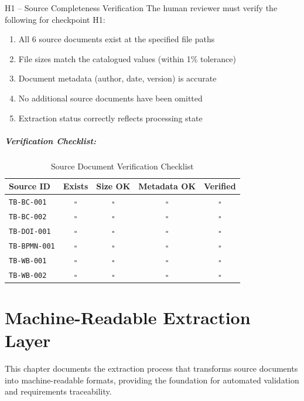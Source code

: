\documentclass[11pt,a4paper,twoside]{report}
\newcommand{\srcref}[1]{\texttt{#1}}
\begin{document}
\begin{hitlbox}{H1 -- Source Completeness Verification}
The human reviewer must verify the following for checkpoint H1:
\begin{enumerate}[noitemsep]
\item All 6 source documents exist at the specified file paths
\item File sizes match the catalogued values (within 1\% tolerance)
\item Document metadata (author, date, version) is accurate
\item No additional source documents have been omitted
\item Extraction status correctly reflects processing state
\end{enumerate}
\end{hitlbox}

\paragraph{Verification Checklist:}

\begin{table}[h]
\centering
\caption{Source Document Verification Checklist}
\begin{tabular}{@{}lcccc@{}}
\toprule
\textbf{Source ID} & \textbf{Exists} & \textbf{Size OK} & \textbf{Metadata OK} & \textbf{Verified} \\
\midrule
\srcref{TB-BC-001} & $\square$ & $\square$ & $\square$ & $\square$ \\
\srcref{TB-BC-002} & $\square$ & $\square$ & $\square$ & $\square$ \\
\srcref{TB-DOI-001} & $\square$ & $\square$ & $\square$ & $\square$ \\
\srcref{TB-BPMN-001} & $\square$ & $\square$ & $\square$ & $\square$ \\
\srcref{TB-WB-001} & $\square$ & $\square$ & $\square$ & $\square$ \\
\srcref{TB-WB-002} & $\square$ & $\square$ & $\square$ & $\square$ \\
\bottomrule
\end{tabular}
\end{table}
\chapter{Machine-Readable Extraction Layer}
\label{ch:extraction-layer}

This chapter documents the extraction process that transforms source
documents into machine-readable formats, providing the foundation for
automated validation and requirements traceability.
\end{document}
